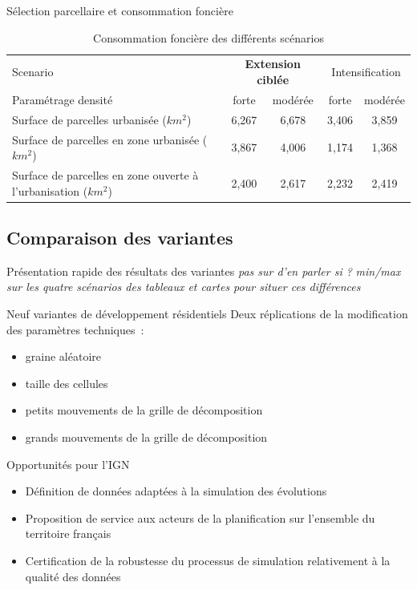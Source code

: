 \documentclass[xcolor=table]{beamer}
\newcommand\FontPetit{\fontsize{8}{6}\selectfont}
\begin{document}
\begin{frame}{Sélection parcellaire et consommation foncière}
\begin{table}
	\caption{Consommation foncière des différents scénarios}
	\scriptsize
	\begin{tabular}{|lcccc|}
		\hline 
		Scenario & \multicolumn{2}{c}{\textbf{Extension ciblée}} & \multicolumn{2}{c}{Intensification} \\ 
		Paramétrage densité & forte &modérée& forte&modérée\\
		\hline 
		Surface de parcelles urbanisée ($km^{2}$)& 6,267 &6,678&3,406& 3,859 \\	
		\hline 
		Surface de parcelles en zone urbanisée ($km^{2}$)& 3,867 &4,006&1,174& 1,368\\	
		\hline 
		Surface de parcelles en zone ouverte à l'urbanisation ($km^{2}$)&2,400&2,617&2,232&2,419\\ 
		\hline 
	\end{tabular} 
\end{table}
\end{frame}

\subsection{Comparaison des variantes}

\begin{frame}{Présentation rapide des résultats des variantes}
\textit{pas sur d'en parler si ?}
\textit{min/max sur les quatre scénarios des tableaux et cartes pour situer ces différences}
\begin{block}{Neuf variantes de développement résidentiels}
	\vspace{0.1cm}
	Deux réplications de la modification des paramètres techniques~:
	\begin{itemize}
		\item graine aléatoire
		\item taille des cellules
		\item petits mouvements de la grille de décomposition
		\item grands mouvements de la grille de décomposition
	\end{itemize}
\end{block}
\end{frame}



\begin{frame}{Opportunités pour l'IGN}
\begin{itemize}
	\item Définition de données adaptées à la simulation des évolutions
	\item Proposition de service aux acteurs de la planification sur l'ensemble du territoire français
	\item Certification de la robustesse du processus de simulation relativement à la qualité des données
\end{itemize}
\end{frame}
\end{document}
